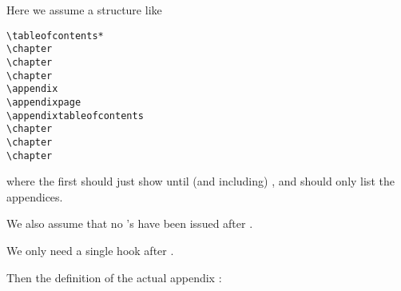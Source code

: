 \begin{sniplet}
  \label{snip:apptoc}
  Here we assume a structure like
\begin{verbatim}
\tableofcontents*
\chapter
\chapter
\chapter
\appendix
\appendixpage
\appendixtableofcontents
\chapter
\chapter
\chapter
\end{verbatim}
where the first \toc{} should just show until (and including) 
\cmd{\appendixpage}, and \cmd{\appendixtableofcontents} should only
list the appendices. 

We also assume that no \cmd{\settocdepth}'s have been issued after
\cmd{\appendixpage}.


We only need a single hook after \cmd{\appendixpage}.
\begin{lcode}
\renewcommand\mempostaddapppagetotochook{\cftinserthook{toc}{BREAK}}
\let\normalchangetocdepth\changetocdepth     %
\end{lcode}
Then the definition of the actual appendix \toc{}:
\begin{lcode}
\makeatletter
\newcommand\appendixtableofcontents{
  \begingroup
  \let\changetocdepth\@gobble
  \normalchangetocdepth{-10}
  \cftinsertcode{BREAK}{\normalchangetocdepth{3}}
  \renewcommand\contentsname{Appendices overview}
  \tableofcontents*
  \endgroup
}
\makeatother
\end{lcode}


\end{sniplet}





